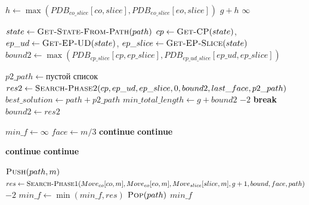 \documentclass{article}
\begin{document}
\begin{algorithm}[H]
\caption{Поиск первой фазы алгоритма IDA*}
\label{alg:find-cycles}
\begin{algorithmic}[1]

\State $h \gets \max(PDB_{co\_slice}[co, slice], PDB_{eo\_slice}[eo, slice])$
    \State\Return $g + h$
\EndIf
{} 
    \State\Return $\infty$
\EndIf
    
    \State $state \gets \Call{Get-State-From-Path}{path}$
    \State $cp \gets \Call{Get-CP}{state}$, $ep\_ud \gets \Call{Get-EP-UD}{state}$, $ep\_slice \gets \Call{Get-EP-Slice}{state}$
    \State $bound2 \gets \max(PDB_{cp\_slice}[cp, ep\_slice], PDB_{ep\_ud\_slice}[ep\_ud, ep\_slice])$
        
        \State $p2\_path \gets \textbf{пустой список}$
        \State $res2 \gets \Call{Search-Phase2}{cp, ep\_ud, ep\_slice, 0, bound2, last\_face, p2\_path}$
            \State $best\_solution \gets path + p2\_path$
            \State $min\_total\_length \gets g + bound2$
                \State\Return $-2$    
            \EndIf
            \State\textbf{break}
        \EndIf
        \State $bound2 \gets res2$
    \EndWhile
\EndIf

\State $min\_f \gets \infty$
    \State $face \gets m / 3$
        \State\textbf{continue} 
    \EndIf
        \State\textbf{continue} 
    \EndIf
        
            \State\textbf{continue} 
        \EndIf
            \State\textbf{continue} 
        \EndIf
    \EndIf
        
    \State $\Call{Push}{path, m}$
    \State $res \gets \Call{Search-Phase1}{Move_{co}[co, m], Move_{eo}[eo, m], Move_{slice}[slice, m], g + 1, bound, face, path}$
        \State\Return $-2$ 
    \EndIf
    \State $min\_f \gets \min(min\_f, res)$
    \State $\Call{Pop}{path}$
\EndFor
\State\Return $min\_f$
\EndProcedure

\end{algorithmic}
\end{algorithm}
\end{document}
